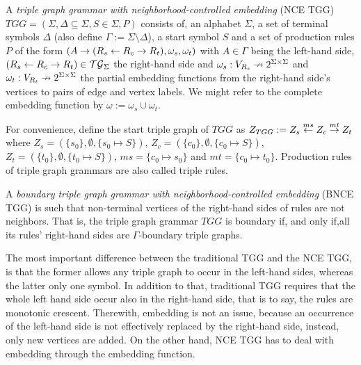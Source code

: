 \begin{definition}
	\label{def:tgg}
	A \emph{triple graph grammar with neighborhood-controlled embedding} (NCE TGG) $TGG = (\Sigma, \Delta \subseteq \Sigma, S \in \Sigma, P)$ consists of, an alphabet $\Sigma$, a set of terminal symbols $\Delta$ (also define $\Gamma := \Sigma \setminus \Delta$), a start symbol $S$ and a set of production rules $P$ of the form $(A \to (R_s \overset{}{\leftarrow} R_c \overset{}{\rightarrow} R_t), \omega_s, \omega_t)$ with $A \in \Gamma$ being the left-hand side, $(R_s \overset{}{\leftarrow} R_c \overset{}{\rightarrow} R_t) \in \mathcal{TG}_{\Sigma}$ the right-hand side and $\omega_s : V_{R_s} \nrightarrow 2^{\Sigma \times \Sigma}$ and $\omega_t : V_{R_t} \nrightarrow 2^{\Sigma \times \Sigma}$ the partial embedding functions from the right-hand side's vertices to pairs of edge and vertex labels. We might refer to the complete embedding function by $\omega:= \omega_s \cup \omega_t$.
	
	For convenience, define the start triple graph of $TGG$ as $Z_{TGG} := Z_s \overset{ms}{\leftarrow} Z_c \overset{mt}{\rightarrow} Z_t$ where $Z_s = (\{s_0\},\emptyset,\{s_0 \mapsto S\})$, $Z_c = (\{c_0\},\emptyset,\{c_0 \mapsto S\})$, $Z_t = (\{t_0\},\emptyset,\{t_0 \mapsto S\})$, $ms = \{c_0 \mapsto s_0 \}$ and $mt = \{c_0 \mapsto t_0 \}$. Production rules of triple graph grammars are also called triple rules.
	
\end{definition}

\begin{definition}
	A \emph{boundary triple graph grammar with neighborhood-controlled embedding} (BNCE TGG) is such that non-terminal vertices of the right-hand sides of rules are not neighbors. That is, the triple graph grammar $TGG$ is boundary if, and only if,all its rules' right-hand sides are $\Gamma\text{-boundary}$ triple graphs.
\end{definition}

The most important difference between the traditional TGG and the NCE TGG, is that the former allows any triple graph to occur in the left-hand sides, whereas the latter only one symbol. In addition to that, traditional TGG requires that the whole left hand side occur also in the right-hand side, that is to say, the rules are monotonic crescent. Therewith, embedding is not an issue, because an occurrence of the left-hand side is not effectively replaced by the right-hand side, instead, only new vertices are added. On the other hand, NCE TGG has to deal with embedding through the embedding function.

